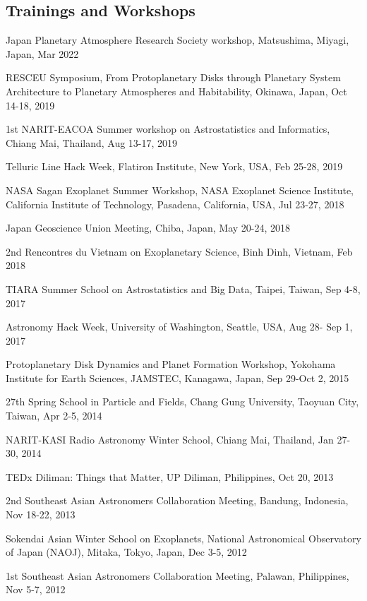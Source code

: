 \documentclass[11pt,letterpaper]{article}
\begin{document}
\subsection{Trainings and Workshops}
\begin{list}{}{\cvlist}
    \item Japan Planetary Atmosphere Research Society workshop, Matsushima, Miyagi, Japan, Mar 2022
    \item RESCEU Symposium, From Protoplanetary Disks through Planetary System Architecture to Planetary Atmospheres and Habitability, Okinawa, Japan, Oct 14-18, 2019
    \item 1st NARIT-EACOA Summer workshop on Astrostatistics and Informatics, Chiang Mai, Thailand, Aug 13-17, 2019
    \item Telluric Line Hack Week, Flatiron Institute, New York, USA, Feb 25-28, 2019
    \item NASA Sagan Exoplanet Summer Workshop, NASA Exoplanet Science Institute, California Institute of Technology, Pasadena, California, USA, Jul 23-27, 2018
    \item Japan Geoscience Union Meeting, Chiba, Japan, May 20-24, 2018
    \item 2nd Rencontres du Vietnam on Exoplanetary Science, Binh Dinh, Vietnam, Feb 2018
    \item TIARA Summer School on Astrostatistics and Big Data, Taipei, Taiwan, Sep 4-8, 2017
    \item Astronomy Hack Week, University of Washington, Seattle, USA, Aug 28- Sep 1, 2017
    \item Protoplanetary Disk Dynamics and Planet Formation Workshop, Yokohama Institute for Earth Sciences, JAMSTEC, Kanagawa, Japan, Sep 29-Oct 2, 2015
    \item 27th Spring School in Particle and Fields, Chang Gung University, Taoyuan City, Taiwan, Apr 2-5, 2014
    \item NARIT-KASI Radio Astronomy Winter School, Chiang Mai, Thailand, Jan 27-30, 2014
    \item TEDx Diliman: Things that Matter, UP Diliman, Philippines, Oct 20, 2013
    \item 2nd Southeast Asian Astronomers Collaboration Meeting, Bandung, Indonesia, Nov 18-22, 2013
    \item Sokendai Asian Winter School on Exoplanets, National Astronomical Observatory of Japan (NAOJ), Mitaka, Tokyo, Japan, Dec 3-5, 2012
    \item 1st Southeast Asian Astronomers Collaboration Meeting, Palawan, Philippines, Nov 5-7, 2012

\end{list}
\end{document}
